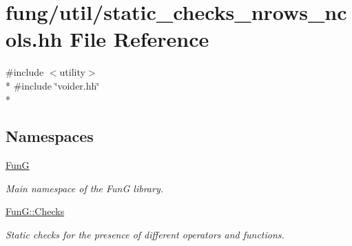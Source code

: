\hypertarget{static__checks__nrows__ncols_8hh}{}\section{fung/util/static\+\_\+checks\+\_\+nrows\+\_\+ncols.hh File Reference}
\label{static__checks__nrows__ncols_8hh}
{\ttfamily \#include $<$utility$>$}\\*
{\ttfamily \#include \char`\"{}voider.\+hh\char`\"{}}\\*
\subsection*{Namespaces}
\begin{DoxyCompactItemize}
\item 
 \hyperlink{namespaceFunG}{Fun\+G}
\begin{DoxyCompactList}\small\item\em Main namespace of the Fun\+G library. \end{DoxyCompactList}\item 
 \hyperlink{namespaceFunG_1_1Checks}{Fun\+G\+::\+Checks}
\begin{DoxyCompactList}\small\item\em Static checks for the presence of different operators and functions. \end{DoxyCompactList}\end{DoxyCompactItemize}
